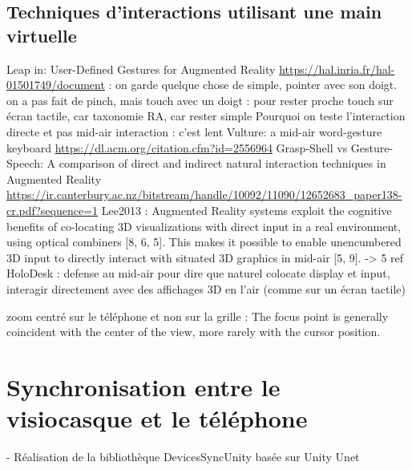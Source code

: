 \subsection{Techniques d'interactions utilisant une main virtuelle}
Leap in:
User-Defined Gestures for Augmented Reality \url{https://hal.inria.fr/hal-01501749/document} : on garde quelque chose de simple, pointer avec son doigt. on a pas fait de pinch, mais touch avec un doigt : pour rester proche touch sur écran tactile, car taxonomie RA, car rester simple
Pourquoi on teste l'interaction directe et pas mid-air interaction : c'est lent Vulture: a mid-air word-gesture keyboard \url{https://dl.acm.org/citation.cfm?id=2556964}
Grasp-Shell vs Gesture-Speech: A comparison of direct and indirect natural interaction
techniques in Augmented Reality \url{https://ir.canterbury.ac.nz/bitstream/handle/10092/11090/12652683_paper138-cr.pdf?sequence=1}
Lee2013 : Augmented Reality systems exploit the cognitive benefits of co-locating 3D visualizations with direct input in a real environment, using optical combiners [8, 6, 5]. This makes it possible to enable unencumbered 3D input to directly interact with situated 3D graphics in mid-air [5, 9]. -> 5 ref HoloDesk : defense au mid-air pour dire que naturel colocate display et input, interagir directement avec des affichages 3D en l'air (comme sur un écran tactile)

zoom centré sur le téléphone et non sur la grille : The focus point is generally coincident with the center of the view, more rarely with the cursor position. \cite{Guiard2004}


\section{Synchronisation entre le visiocasque et le téléphone}

- Réalisation de la bibliothèque DevicesSyncUnity basée sur Unity Unet
